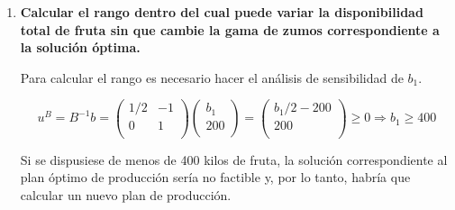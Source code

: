 \begin{enumerate}[label=\alph*)]
    Es decir, $V^B_{x_2}$ es la diferencia entre:
    \begin{itemize}
        \item $c_{x_2}=4$, que la contribución unitaria por la venta de un litro de zumo de piña y
        \item lo que se deja de ingresar por el cambio del plan de producción reflejado en el cambio de las variables básicas:
        \begin{itemize}
            \item $p^B_{12} = 1/2$ y $c^B_1=c^B_{x_4}=3$, es decir, se produciría medio kilo menos de zumo de naranja a granel y como cada uno ofrece un beneficio de 3 euros, se renunciaría a 1,5 euros.
            \item $p^B_{22} = 1$ y $c^B_2=c^B_{x_1}=3$, es decir, se producirá 1 kilo menos de manzana y como cada una ofrece un beneficio de 3 euros, se renunciaría a 3 euros.
        \end{itemize}
    \end{itemize}

    El resultado es que, por un lado, se incrementarían el beneficio en 4 pero se reduciría en 4.5 euros, por otro, y el resultado neto es una reducción del beneficio de 0.5 euros.

    
    \item \textbf{Calcular el rango dentro del cual puede variar la disponibilidad total de fruta sin que cambie la gama de zumos correspondiente a la solución óptima.}

    Para calcular el rango es necesario hacer el análisis de sensibilidad de $b_1$.

    \[
    u^B = B^{-1}b = 
    \begin{pmatrix}
    1/2 & -1\\
    0 & 1\\
    \end{pmatrix}
    \begin{pmatrix}
    b_1\\
    200\\
    \end{pmatrix}=
    \begin{pmatrix}
    b_1/2-200\\
    200\\
    \end{pmatrix}\geq 0 \Rightarrow b_1 \geq 400
    \]

    Si se dispusiese de menos de 400 kilos de fruta, la solución correspondiente al plan óptimo de producción sería no factible y, por lo tanto, habría que calcular un nuevo plan de producción.


\end{enumerate}
